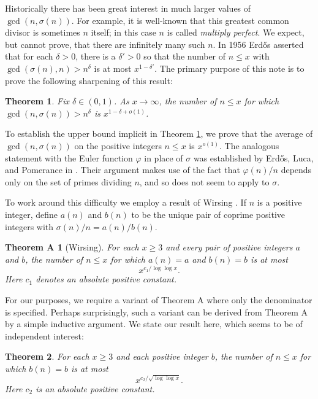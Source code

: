 \documentclass[12pt]{amsart}
\newtheorem{thm}{Theorem}
\newtheorem*{thma}{Theorem A}
\theoremstyle{definition}
\theoremstyle{remark}
\renewcommand\phi\varphi
\begin{document}
Historically there has been great interest in much larger values of $\gcd(n,\sigma(n))$. For example, it is well-known that this greatest common divisor is sometimes $n$ itself; in this case $n$ is called \emph{multiply perfect}. We expect, but cannot prove, that there are infinitely many such $n$. In 1956 Erd\H{o}s \cite[p. 254]{erdos56} asserted that for each $\delta > 0$, there is a $\delta'>0$ so that the number of $n \leq x$ with $\gcd(\sigma(n),n) > n^{\delta}$ is at most $x^{1-\delta'}$. The primary purpose of this note is to prove the following sharpening of this result:

\begin{thm}\label{thm:erdosstatement} Fix $\delta \in (0,1)$. As $x\to\infty$, the number of $n \leq x$ for which $\gcd(n,\sigma(n)) > n^{\delta}$ is $x^{1-\delta+o(1)}$.
\end{thm}

To establish the upper bound implicit in Theorem \ref{thm:erdosstatement}, we prove that the average of $\gcd(n,\sigma(n))$ on the positive integers $n \leq x$ is $x^{o(1)}$. The analogous statement with the Euler function $\phi$ in place of $\sigma$ was established by Erd\H{o}s, Luca, and Pomerance in \cite[Theorem 11]{ELP08}. Their argument makes use of the fact that $\phi(n)/n$ depends only on the set of primes dividing $n$, and so does not seem to apply to $\sigma$.

To work around this difficulty we employ a result of Wirsing \cite{wirsing59}. If $n$ is a positive integer, define $a(n)$ and $b(n)$ to be the unique pair of coprime positive integers with $\sigma(n)/n = a(n)/b(n)$.

\begin{thma}[Wirsing] For each $x\geq 3$ and every pair of positive integers $a$ and $b$, the number of $n \leq  x$ for which $a(n)=a$ and $b(n)=b$ is at most
\[ x^{c_1/\log\log{x}}. \]
Here $c_1$ denotes an absolute positive constant.
\end{thma}

For our purposes, we require a variant of Theorem A where only the denominator is specified. Perhaps surprisingly, such a variant can be derived from Theorem A by a simple inductive argument. We state our result here, which seems to be of independent interest:

\begin{thm}\label{thm:wirsingish} For each $x\geq 3$ and each positive integer $b$, the number of $n \leq  x$ for which $b(n)=b$ is at most
\[ x^{c_2/\sqrt{\log\log{x}}}. \]
Here $c_2$ is an absolute positive constant.
\end{thm}
\end{document}
